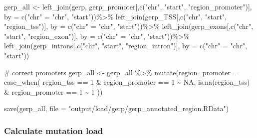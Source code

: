 \documentclass[
  letterpaper,
  DIV=11,
  numbers=noendperiod]{scrreprt}
\newenvironment{Shaded}{}{}
\newcommand{\AttributeTok}[1]{\textcolor[rgb]{0.84,0.23,0.29}{#1}}
\newcommand{\CommentTok}[1]{\textcolor[rgb]{0.42,0.45,0.49}{#1}}
\newcommand{\ConstantTok}[1]{\textcolor[rgb]{0.00,0.36,0.77}{#1}}
\newcommand{\DecValTok}[1]{\textcolor[rgb]{0.00,0.36,0.77}{#1}}
\newcommand{\FunctionTok}[1]{\textcolor[rgb]{0.44,0.26,0.76}{#1}}
\newcommand{\NormalTok}[1]{\textcolor[rgb]{0.14,0.16,0.18}{#1}}
\newcommand{\OtherTok}[1]{\textcolor[rgb]{0.44,0.26,0.76}{#1}}
\newcommand{\SpecialCharTok}[1]{\textcolor[rgb]{0.00,0.36,0.77}{#1}}
\newcommand{\StringTok}[1]{\textcolor[rgb]{0.01,0.18,0.38}{#1}}
\begin{document}
\begin{Shaded}
\begin{Highlighting}[]
\NormalTok{gerp\_all }\OtherTok{\textless{}{-}} \FunctionTok{left\_join}\NormalTok{(gerp, gerp\_promoter[,}\FunctionTok{c}\NormalTok{(}\StringTok{"chr"}\NormalTok{, }\StringTok{"start"}\NormalTok{, }\StringTok{"region\_promoter"}\NormalTok{)], }\AttributeTok{by =} \FunctionTok{c}\NormalTok{(}\StringTok{"chr"} \OtherTok{=} \StringTok{"chr"}\NormalTok{, }\StringTok{"start"}\NormalTok{))}\SpecialCharTok{\%\textgreater{}\%}
   \FunctionTok{left\_join}\NormalTok{(gerp\_TSS[,}\FunctionTok{c}\NormalTok{(}\StringTok{"chr"}\NormalTok{, }\StringTok{"start"}\NormalTok{, }\StringTok{"region\_tss"}\NormalTok{)], }\AttributeTok{by =} \FunctionTok{c}\NormalTok{(}\StringTok{"chr"} \OtherTok{=} \StringTok{"chr"}\NormalTok{, }\StringTok{"start"}\NormalTok{))}\SpecialCharTok{\%\textgreater{}\%}
  \FunctionTok{left\_join}\NormalTok{(gerp\_exons[,}\FunctionTok{c}\NormalTok{(}\StringTok{"chr"}\NormalTok{, }\StringTok{"start"}\NormalTok{, }\StringTok{"region\_exon"}\NormalTok{)], }\AttributeTok{by =} \FunctionTok{c}\NormalTok{(}\StringTok{"chr"} \OtherTok{=} \StringTok{"chr"}\NormalTok{, }\StringTok{"start"}\NormalTok{))}\SpecialCharTok{\%\textgreater{}\%}
  \FunctionTok{left\_join}\NormalTok{(gerp\_introns[,}\FunctionTok{c}\NormalTok{(}\StringTok{"chr"}\NormalTok{, }\StringTok{"start"}\NormalTok{, }\StringTok{"region\_intron"}\NormalTok{)], }\AttributeTok{by =} \FunctionTok{c}\NormalTok{(}\StringTok{"chr"} \OtherTok{=} \StringTok{"chr"}\NormalTok{, }\StringTok{"start"}\NormalTok{))}
 
\CommentTok{\# correct promoters}
\NormalTok{gerp\_all }\OtherTok{\textless{}{-}}\NormalTok{ gerp\_all }\SpecialCharTok{\%\textgreater{}\%} \FunctionTok{mutate}\NormalTok{(}\AttributeTok{region\_promoter =} \FunctionTok{case\_when}\NormalTok{(}
\NormalTok{  region\_tss }\SpecialCharTok{==} \DecValTok{1} \SpecialCharTok{\&}\NormalTok{ region\_promoter }\SpecialCharTok{==} \DecValTok{1} \SpecialCharTok{\textasciitilde{}} \ConstantTok{NA}\NormalTok{,}
  \FunctionTok{is.na}\NormalTok{(region\_tss) }\SpecialCharTok{\&}\NormalTok{ region\_promoter }\SpecialCharTok{==} \DecValTok{1} \SpecialCharTok{\textasciitilde{}} \DecValTok{1}
\NormalTok{))}

\FunctionTok{save}\NormalTok{(gerp\_all, }\AttributeTok{file =} \StringTok{"output/load/gerp/gerp\_annotated\_region.RData"}\NormalTok{)}
\end{Highlighting}
\end{Shaded}

\hypertarget{calculate-mutation-load}{%
\subsubsection{Calculate mutation load}\label{calculate-mutation-load}}
\end{document}
